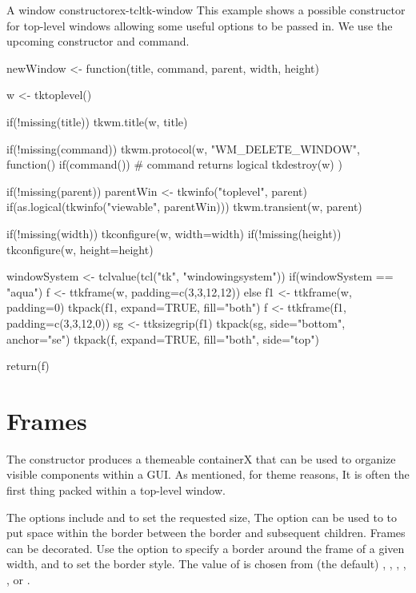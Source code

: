 \begin{example}{A window constructor}{ex-tcltk-window}
  This example shows a possible constructor for top-level windows
  allowing some useful options to be passed in. We use the upcoming
   constructor and  command.
\begin{Schunk}
\begin{Sinput}
 newWindow <- function(title, command, parent,
                       width, height) {
   w <- tktoplevel()
 
   if(!missing(title)) tkwm.title(w, title)
 
   if(!missing(command)) 
     tkwm.protocol(w, "WM_DELETE_WINDOW", function() {
       if(command())            # command returns logical
         tkdestroy(w)
     })
 
   if(!missing(parent)) {
     parentWin <- tkwinfo("toplevel", parent)
     if(as.logical(tkwinfo("viewable", parentWin))) {
       tkwm.transient(w, parent)
     }
   }
   
   if(!missing(width)) tkconfigure(w, width=width)
   if(!missing(height)) tkconfigure(w, height=height)
 
   windowSystem <- tclvalue(tcl("tk", "windowingsystem"))
   if(windowSystem == "aqua") {
     f <- ttkframe(w, padding=c(3,3,12,12))
   } else {
     f1 <- ttkframe(w, padding=0)
     tkpack(f1, expand=TRUE, fill="both")
     f <- ttkframe(f1, padding=c(3,3,12,0))
     sg <- ttksizegrip(f1)
     tkpack(sg, side="bottom", anchor="se")
   }
   tkpack(f, expand=TRUE, fill="both", side="top")
 
   return(f)
 }
\end{Sinput}
\end{Schunk}
\end{example}

\section{Frames}
\label{sec:tcltk:frames}

The  constructor produces a themeable containerX
that can be used to organize visible components within a GUI. As
mentioned, for theme reasons, It is
often the first thing packed within a top-level window. 

The options include  and
 to set the requested size,
The 
option can be used to to put space within the border between the
border and subsequent children. Frames can be decorated. Use the
option  to specify a border around the frame of
a given width, and  to set the border
style. The value of  is chosen from (the default)
, , , ,
, or .  

